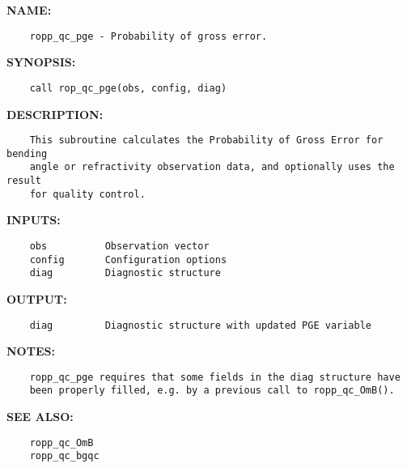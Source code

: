 \label{ch:robo51}
\label{ch:QC_ropp_qc_pge}
\textbf{NAME:}\hspace{0.08in}\begin{Verbatim}
    ropp_qc_pge - Probability of gross error.
\end{Verbatim}
\textbf{SYNOPSIS:}\hspace{0.08in}\begin{Verbatim}
    call rop_qc_pge(obs, config, diag)
\end{Verbatim}
\textbf{DESCRIPTION:}\hspace{0.08in}\begin{Verbatim}
    This subroutine calculates the Probability of Gross Error for bending
    angle or refractivity observation data, and optionally uses the result
    for quality control.
\end{Verbatim}
\textbf{INPUTS:}\hspace{0.08in}\begin{Verbatim}
    obs          Observation vector
    config       Configuration options
    diag         Diagnostic structure
\end{Verbatim}
\textbf{OUTPUT:}\hspace{0.08in}\begin{Verbatim}
    diag         Diagnostic structure with updated PGE variable
\end{Verbatim}
\textbf{NOTES:}\hspace{0.08in}\begin{Verbatim}
    ropp_qc_pge requires that some fields in the diag structure have
    been properly filled, e.g. by a previous call to ropp_qc_OmB().
\end{Verbatim}
\textbf{SEE ALSO:}\hspace{0.08in}\begin{Verbatim}
    ropp_qc_OmB
    ropp_qc_bgqc
\end{Verbatim}
